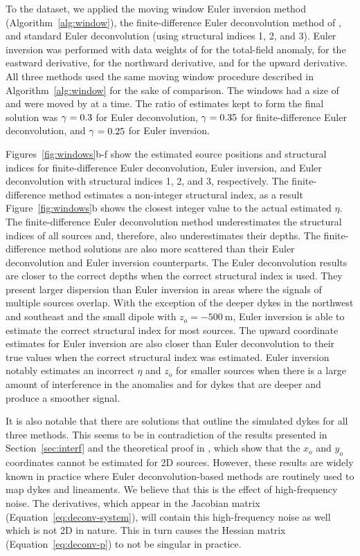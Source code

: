 To the dataset, we applied the moving window Euler inversion method
(Algorithm~\ref{alg:window}), the finite-difference Euler deconvolution method
of \citet{Gerovska2005}, and standard Euler deconvolution (using structural
indices 1, 2, and 3).
Euler inversion was performed with data weights of \DefaultWeightsF{} for the
total-field anomaly, \DefaultWeightsE{} for the eastward derivative,
\DefaultWeightsN{} for the northward derivative, and \DefaultWeightsU{} for the
upward derivative.
All three methods used the same moving window procedure described in
Algorithm~\ref{alg:window} for the sake of comparison.
The windows had a size of \SynWinWindowSize{} and were moved by
\SynWinWindowStep{} at a time.
The ratio of estimates kept to form the final solution was
$\gamma=0.3$ for Euler deconvolution, $\gamma=0.35$ for
finite-difference Euler deconvolution, and $\gamma=0.25$ for Euler
inversion.

Figures~\ref{fig:windows}b-f show the estimated source positions and structural
indices for finite-difference Euler deconvolution, Euler inversion, and Euler
deconvolution with structural indices 1, 2, and 3, respectively.
The finite-difference method estimates a non-integer structural index, as
a result Figure~\ref{fig:windows}b shows the closest integer value to the
actual estimated $\eta$.
The finite-difference Euler deconvolution method underestimates the structural
indices of all sources and, therefore, also underestimates their depths.
The finite-difference method solutions are also more scattered than their Euler
deconvolution and Euler inversion counterparts.
The Euler deconvolution results are closer to the correct depths when the
correct structural index is used.
They present larger dispersion than Euler inversion in areas where the signals
of multiple sources overlap.
With the exception of the deeper dykes in the northwest and southeast and the
small dipole with $z_o=\qty{-500}{\m}$, Euler inversion is able to estimate the
correct structural index for most sources.
The upward coordinate estimates for Euler inversion are also closer than Euler
deconvolution to their true values when the correct structural index was
estimated.
Euler inversion notably estimates an incorrect $\eta$ and $z_o$ for smaller
sources when there is a large amount of interference in the anomalies and for
dykes that are deeper and produce a smoother signal.

It is also notable that there are solutions that outline the simulated dykes
for all three methods.
This seems to be in contradiction of the results presented in
Section~\ref{sec:interf} and the theoretical proof in
\citet{Mushayandebvu2004}, which show that the $x_o$ and $y_o$ coordinates
cannot be estimated for 2D sources.
However, these results are widely known in practice where Euler
deconvolution-based methods are routinely used to map dykes and lineaments.
We believe that this is the effect of high-frequency noise.
The derivatives, which appear in the Jacobian matrix
(Equation~\ref{eq:deconv-system}), will contain this high-frequency noise as
well which is not 2D in nature.
This in turn causes the Hessian matrix (Equation~\ref{eq:deconv-p}) to not be
singular in practice.


